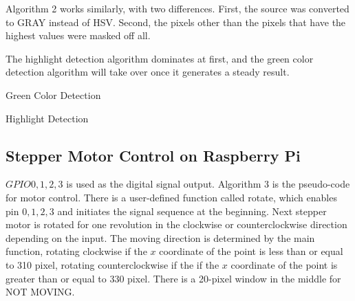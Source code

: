 Algorithm 2 works similarly, with two differences. First, the source was converted to GRAY instead of HSV. Second, the pixels other than the pixels that have the highest values were masked off all. 

The highlight detection algorithm dominates at first, and the green color detection algorithm will take over once it generates a steady result.

\begin{algorithm}
\caption{Green Color Detection}
\begin{algorithmic} 
\ELSE 
{}
\ENDIF
\ENDFOR
{}
\end{algorithmic}
\end{algorithm}

\begin{algorithm}
\caption{Highlight Detection}
\begin{algorithmic} 
\ELSE 
{}
\ENDIF
\ENDFOR	
{}
\end{algorithmic}
\end{algorithm}

\subsection{Stepper Motor Control on Raspberry Pi}


$GPIO 0,1,2,3$ is used as the digital signal output. Algorithm 3 is the pseudo-code for motor control. There is a user-defined function called rotate, which enables pin $0,1,2,3$ and initiates the signal sequence at the beginning. Next stepper motor is rotated for one revolution in the clockwise or counterclockwise direction depending on the input. The moving direction is determined by the main function, rotating clockwise if the $x$ coordinate of the point is less than or equal to 310 pixel, rotating counterclockwise if the if the $x$ coordinate of the point is greater than or equal to 330 pixel. There is a 20-pixel window in the middle for NOT MOVING. 

